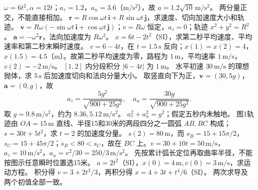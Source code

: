 \workings $\omega=6t^2,\alpha=12t$；$a_\tau=1.2$，$a_n=3.6$（$\mathrm{m/s^2}$），故 $a=1.2\sqrt{10}\,\mathrm{m/s^2}$。
\crosscheck 两分量正交，不能直接相加。
\problemtext $\bm r=R\cos\omega t\,\bm i+R\sin\omega t\,\bm j$，求速度、切向加速度大小和轨迹。
\workings $\bm v=R\omega(-\sin\omega t\,\bm i+\cos\omega t\,\bm j)$；$v=R\omega$ 恒定，$a_\tau=0$；轨迹 $x^2+y^2=R^2$。
\crosscheck $\bm a=-\omega^2\bm r$，法向加速度为 $R\omega^2$。
\problemtext $x=6t-2t^2$（SI），求第二秒平均速度、平均速率和第二秒末瞬时速度。
\workings $v=6-4t$，在 $t=1.5\,\mathrm s$ 反向；$x(1)=x(2)=4$，$x(1.5)=4.5$（m）。故第二秒平均速度为零，路程为 $1\,\mathrm m$，平均速率 $1\,\mathrm{m/s}$，$v(2)=-2\,\mathrm{m/s}$。
\crosscheck $[1,2]$ 内分段积分 $|6-4t|$ 为 $1\,\mathrm m$。
\problemtext 水平初速 $30\,\mathrm{m/s}$ 的理想抛体，求 $5\,\mathrm s$ 后加速度切向和法向分量大小。
\workings 取竖直向下为正，$\bm v=(30,5g)$，$\bm a=(0,g)$，故
\[
a_\tau=\frac{5g^2}{\sqrt{900+25g^2}},\quad a_n=\frac{30g}{\sqrt{900+25g^2}}.
\]
取 $g=9.8\,\mathrm{m/s^2}$，约为 $8.36,5.12\,\mathrm{m/s^2}$。
\crosscheck $a_\tau^2+a_n^2=g^2$；假定五秒内未触地。
\problemtext 图1轨迹由 $OA=15\,\mathrm m$ 直线、半径15和30米的两段四分之一圆弧 $AB,BC$ 构成；$s=30t+5t^2$，求 $t=2$ 的加速度分量。
\workings $s(2)=80\,\mathrm m$，而 $s_B=15+15\pi/2$，$s_C=15+45\pi/2$；$s_B<80<s_C$，故在 $BC$ 上。$v=30+10t=50\,\mathrm{m/s}$，$a_\tau=10\,\mathrm{m/s^2}$，$a_n=v^2/30=250/3\,\mathrm{m/s^2}$。
\crosscheck 先按累计弧长定位再取曲率半径，不能按图示任意瞬时位置选15米。
\problemtext $a=2t^2$（SI），$x(0)=4\,\mathrm m,v(0)=3\,\mathrm{m/s}$，求运动方程。
\workings 积分得 $v=3+2t^3/3$，再积分得 $x=4+3t+t^4/6$（SI）。
\crosscheck 两次求导及两个初值全部一致。
